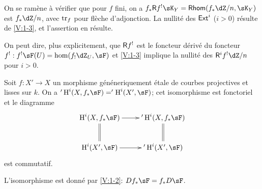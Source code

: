 On se ram\`ene \`a v\'erifier que pour $f$ fini, on a 
$f_\ast \R f^!\sK_Y = \rHom(f_\ast\dZ/n,\sK_Y)$ est $f_\ast\dZ/n$, avec $\operatorname{tr}_f$ 
pour fl\`eche d'adjonction. La nullit\'e des $\operatorname{\mathsf{Ext}}^i$ ($i>0$) r\'esulte de 
\ref{V:1-3}, et l'assertion en r\'esulte. 

On peut dire, plus explicitement, que $\mathsf{R} f^!$ est le foncteur d\'eriv\'e du 
foncteur $f^!:f^!\sF(U)=\hom(f_!\dZ_U,\sF)$ et \ref{V:1-3} implique la 
nullit\'e des $\R^i f^!\dZ/n$ pour $i>0$.





\begin{corollary_}\label{V:2-4}
Soit $f:X'\to X$ un morphisme g\'en\'eneriquement \'etale de courbes 
projectives et lisses sur $k$. On a $'\h^i(X,f_\ast \sF)='\h^i(X',\sF)$; cet 
isomorphisme est fonctoriel et le diagramme 
\[\xymatrix{
  \h^i(X,f_\ast\sF) \ar[r] \ar@{=}[d] 
    & '\h^i(X,f_\ast\sF) \ar@{=}[d] \\
  \h^i(X',\sF) \ar[r] 
    & '\h^i(X',\sF) 
}\]
est commutatif.
\end{corollary_}

L'isomorphisme est donn\'e par \ref{V:1-2}: $D f_\ast\sF=f_\ast D\sF$. 



